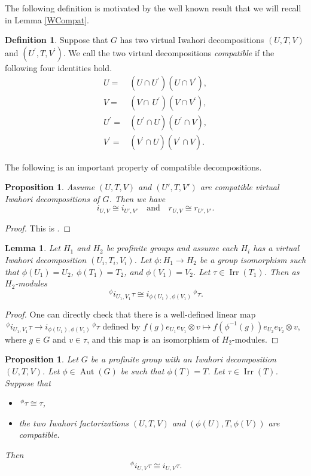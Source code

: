 \documentclass[10pt, letterpaper]{amsart}
\theoremstyle{plain}
\newtheorem{Prop}[equation]{Proposition}
\newtheorem{Lem}[equation]{Lemma}
\theoremstyle{definition}
\newtheorem{Def}[equation]{Definition}
\numberwithin{equation}{section}
\newcommand{\Irr}{\operatorname{Irr}}
\newcommand{\Aut}{\operatorname{Aut}}
\newcommand{\qand}{{\quad\text{and}\quad}}
\begin{document}
The following definition is motivated by the well known result that we will recall in Lemma \ref{WCompat}.
\begin{Def}
	Suppose that $G$ has two virtual Iwahori decompositions $(U,T,V)$ and $(U^{\prime},T,V^{\prime})$. We call the two virtual decompositions {\it compatible} if the following four identities hold. 
	\begin{align*}
		U=&(U\cap U^{\prime})(U\cap V^{\prime}),\\
		V=&(V\cap \,U^{\prime})(V\cap V^{\prime}),\\
		U^{\prime}=&(U^{\prime}\cap U)(U^{\prime}\cap V),\\
		V^{\prime}=&(V^{\prime}\cap U)(V^{\prime}\cap V).
	\end{align*}
\end{Def}


The following is an important property of compatible decompositions.
\begin{Prop}\label{P:compatible_Iwahori_decomp}
Assume $(U, T, V)$ and $(U', T, V')$ are compatible virtual Iwahori decompositions of $G$. Then we have
\[
i_{U, V}\cong i_{U', V'}\qand r_{U, V}\cong r_{U', V'}.
\]
\end{Prop}
\begin{proof}
    This is \cite[Theorem 2.18 (4)]{CMO19}.
\end{proof}




\begin{Lem}\label{IsoTwist}
	Let $H_1$ and $H_2$ be profinite groups and assume each $H_i$ has a virtual Iwahori decomposition $(U_{i},T_{i},V_{i})$. Let $\phi:H_{1}\rightarrow H_{2}$ be a group isomorphism such that $\phi(U_{1})=U_{2}$, $\phi(T_{1})=T_{2}$, and $\phi(V_{1})=V_{2}$. Let $\tau\in\Irr(T_{1})$. Then as $H_{2}$-modules
	\begin{equation*}
		\,^{\phi}i_{U_1,V_1}\tau\cong i_{\phi(U_1),\phi(V_1)}\,^{\phi}\tau. 
	\end{equation*}
\end{Lem}
\begin{proof}
	One can directly check that there is a well-defined linear map $\,^{\phi}i_{U_1,V_1}\tau\rightarrow i_{\phi(U_1),\phi(V_1)}\,^{\phi}\tau$ defined by $f(g)e_{U_{1}}e_{V_{1}}\otimes v\mapsto f(\phi^{-1}(g))e_{U_{2}}e_{V_{2}}\otimes v$, where $g\in G$ and $v\in \tau$, and this map is an isomorphism of $H_{2}$-modules. 
\end{proof}


\begin{Prop}\label{TwistAut}
	Let $G$ be a profinite group with an Iwahori decomposition $(U,T,V)$. Let $\phi\in\Aut(G)$ be such that $\phi(T)=T$. Let $\tau\in\Irr(T)$.
	Suppose that 
	\begin{itemize}
		\item $\,^{\phi}\tau\cong \tau$, 
		\item the two Iwahori factorizations $(U,T,V)$ and $(\phi(U),T,\phi(V))$ are compatible.
	\end{itemize} 
	Then
	\begin{equation*}
		\,^{\phi}i_{U,V}\tau\cong i_{U,V}\tau.
	\end{equation*}
\end{Prop}
\end{document}
